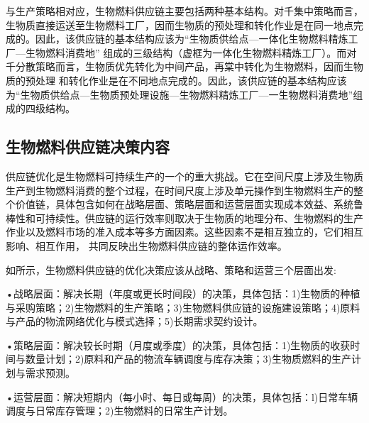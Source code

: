 与生产策略相对应，生物燃料供应链主要包括两种基本结构。对千集中策略而言，生物质直接运送至生物燃料工厂，因而生物质的预处理和转化作业是在同一地点完成的。因此，该供应链的基本结构应该为“生物质供给点—一体化生物燃料精炼工厂—生物燃料消费地” 组成的三级结构（虚框为一体化生物燃料精炼工厂）。而对千分散策略而言，生物质优先转化为中间产品，再棠中转化为生物燃料，因而生物质的预处理 和转化作业是在不同地点完成的。因此，该供应链的基本结构应该为“生物质供给点—生物质预处理设施—生物燃料精炼工厂—一生物燃料消费地”组成的四级结构。

\subsection{生物燃料供应链决策内容}
供应链优化是生物燃料可持续生产的一个的重大挑战\cite{Seay2014}。它在空间尺度上涉及生物质生产到生物燃料消费的整个过程，在时间尺度上涉及单元操作到生物燃料生产的整个价值链，具体包含如何在战略层面、策略层面和运营层面实现成本效益、系统鲁棒性和可持续性\cite{Yue2014}。供应链的运行效率则取决于生物质的地理分布、生物燃料的生产作业以及燃料市场的准入成本等多方面因素\cite{Chen2012}。这些因素不是相互独立的，它们相互影响、相互作用， 共同反映出生物燃料供应链的整体运作效率\cite{Bai2012}。

如所示，生物燃料供应链的优化决策应该从战略、策略和运营三个层面出发\cite{Awudu2012,An2011,Meyer2012}:

•战略层面：解决长期（年度或更长时间段）的决策，具体包括：1)生物质的种植与采购策略；2)生物燃料的生产策略；3)生物燃料供应链的设施建设策略；4)原料与产品的物流网络优化与模式选择；5)长期需求契约设计。

•策略层面：解决较长时期（月度或季度）的决策，具体包括：1)生物质的收获时间与数量计划；2)原料和产品的物流车辆调度与库存决策；3)生物质燃料的生产计划与需求预测。

•运营层面：解决短期内（每小时、每日或每周）的决策，具体包括：l)日常车辆调度与日常库存管理；2)生物燃料的日常生产计划。

